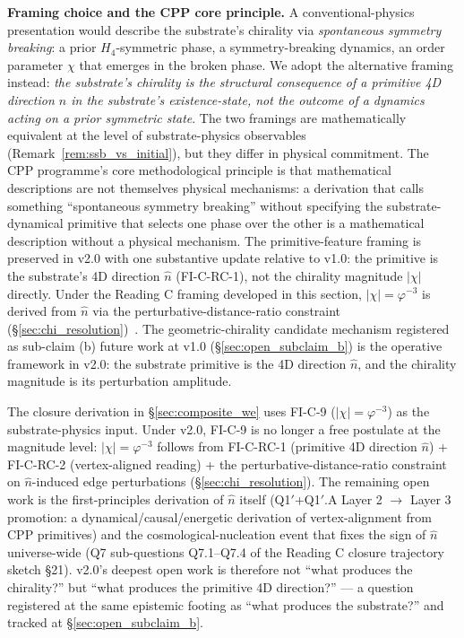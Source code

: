 \documentclass[11pt,letterpaper]{article}
\newcommand{\phig}{\varphi}
\newcommand{\Hfour}{H_4}
\begin{document}
\textbf{Framing choice and the CPP core principle.} A conventional-physics presentation would describe the substrate's chirality via \emph{spontaneous symmetry breaking}: a prior $\Hfour$-symmetric phase, a symmetry-breaking dynamics, an order parameter $\chi$ that emerges in the broken phase. We adopt the alternative framing instead: \emph{the substrate's chirality is the structural consequence of a primitive 4D direction $\hat{n}$ in the substrate's existence-state, not the outcome of a dynamics acting on a prior symmetric state}. The two framings are mathematically equivalent at the level of substrate-physics observables (Remark~\ref{rem:ssb_vs_initial}), but they differ in physical commitment. The CPP programme's core methodological principle is that mathematical descriptions are not themselves physical mechanisms: a derivation that calls something ``spontaneous symmetry breaking'' without specifying the substrate-dynamical primitive that selects one phase over the other is a mathematical description without a physical mechanism. The primitive-feature framing is preserved in v2.0 with one substantive update relative to v1.0: the primitive is the substrate's 4D direction $\hat{n}$ (FI-C-RC-1), not the chirality magnitude $|\chi|$ directly. Under the Reading C framing developed in this section, $|\chi| = \phig^{-3}$ is derived from $\hat{n}$ via the perturbative-distance-ratio constraint (\S\ref{sec:chi_resolution})~\cite{abshier_capotauro_chiral_mechanism_sketch}. The geometric-chirality candidate mechanism registered as sub-claim (b) future work at v1.0 (\S\ref{sec:open_subclaim_b}) is the operative framework in v2.0: the substrate primitive is the 4D direction $\hat{n}$, and the chirality magnitude is its perturbation amplitude.

The closure derivation in \S\ref{sec:composite_we} uses FI-C-9 ($|\chi| = \phig^{-3}$) as the substrate-physics input. Under v2.0, FI-C-9 is no longer a free postulate at the magnitude level: $|\chi| = \phig^{-3}$ follows from FI-C-RC-1 (primitive 4D direction $\hat{n}$) + FI-C-RC-2 (vertex-aligned reading) + the perturbative-distance-ratio constraint on $\hat{n}$-induced edge perturbations (\S\ref{sec:chi_resolution}). The remaining open work is the first-principles derivation of $\hat{n}$ itself (Q1$'$+Q1$'$.A Layer 2 $\to$ Layer 3 promotion: a dynamical/causal/energetic derivation of vertex-alignment from CPP primitives) and the cosmological-nucleation event that fixes the sign of $\hat{n}$ universe-wide (Q7 sub-questions Q7.1--Q7.4 of the Reading C closure trajectory~\cite{abshier_capotauro_chiral_mechanism_sketch} sketch \S21). v2.0's deepest open work is therefore not ``what produces the chirality?'' but ``what produces the primitive 4D direction?'' --- a question registered at the same epistemic footing as ``what produces the substrate?'' and tracked at \S\ref{sec:open_subclaim_b}.
\end{document}
